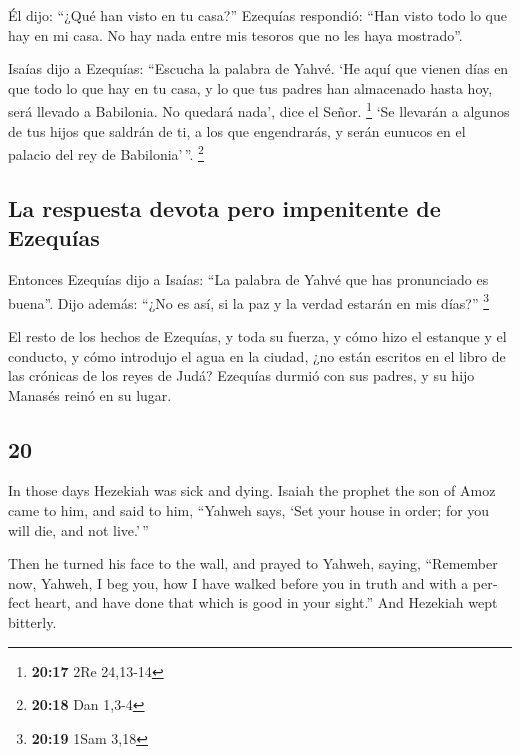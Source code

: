 \begin{paracol}{2}
 Él dijo: ``¿Qué han visto en tu casa?'' Ezequías
respondió: ``Han visto todo lo que hay en mi casa. No hay nada entre mis
tesoros que no les haya mostrado''.

 Isaías dijo a Ezequías: ``Escucha la palabra de Yahvé.
 `He aquí que vienen días en que todo lo que hay en tu
casa, y lo que tus padres han almacenado hasta hoy, será llevado a
Babilonia. No quedará nada', dice el Señor. \footnote{\textbf{20:17} 2Re
  24,13-14}  `Se llevarán a algunos de tus hijos que
saldrán de ti, a los que engendrarás, y serán eunucos en el palacio del
rey de Babilonia'\,''. \footnote{\textbf{20:18} Dan 1,3-4}

\hypertarget{la-respuesta-devota-pero-impenitente-de-ezequuxedas}{%
\subsection{La respuesta devota pero impenitente de
Ezequías}\label{la-respuesta-devota-pero-impenitente-de-ezequuxedas}}

 Entonces Ezequías dijo a Isaías: ``La palabra de Yahvé
que has pronunciado es buena''. Dijo además: ``¿No es así, si la paz y
la verdad estarán en mis días?'' \footnote{\textbf{20:19} 1Sam 3,18}

 El resto de los hechos de Ezequías, y toda su fuerza, y
cómo hizo el estanque y el conducto, y cómo introdujo el agua en la
ciudad, ¿no están escritos en el libro de las crónicas de los reyes de
Judá?  Ezequías durmió con sus padres, y su hijo Manasés
reinó en su lugar.

\switchcolumn
\begin{otherlanguage}{english}

\hypertarget{section-39}{%
\section{20}\label{section-39}}

 In those days Hezekiah was sick and dying. Isaiah the
prophet the son of Amoz came to him, and said to him, ``Yahweh says,
`Set your house in order; for you will die, and not live.'\,''

 Then he turned his face to the wall, and prayed to
Yahweh, saying,  ``Remember now, Yahweh, I beg you, how I
have walked before you in truth and with a perfect heart, and have done
that which is good in your sight.'' And Hezekiah wept bitterly.


\end{otherlanguage}
\end{paracol}
